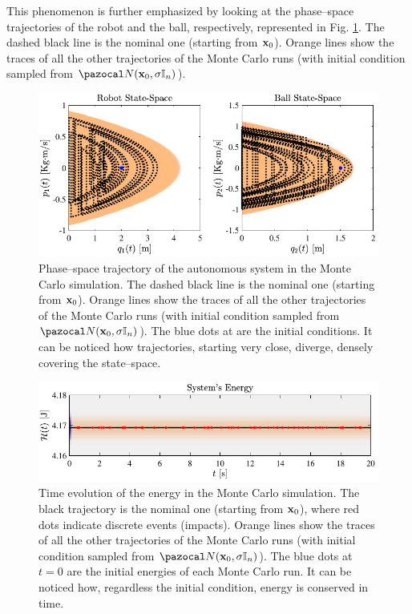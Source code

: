 This phenomenon is further emphasized by looking at the phase--space trajectories of the robot and the ball, respectively, represented in Fig. \ref{fig:chaos2}. The dashed black line is the nominal one (starting from $\mathbf{x}_0$). Orange lines show the traces of all the other trajectories of the Monte Carlo runs (with initial condition sampled from $\N(\xb_0,\sigma\mathbb{I}_n)$). 
%
\begin{figure}[!ht]
    \centering
    \includegraphics[width = \linewidth]{Figures/chaos2.pdf}
    \caption[Phase--space trajectory of the autonomous system in the Monte Carlo simulation]{Phase--space trajectory of the autonomous system in the Monte Carlo simulation. The dashed black line is the nominal one (starting from $\mathbf{x}_0$). Orange lines show the traces of all the other trajectories of the Monte Carlo runs (with initial condition sampled from $\N(\xb_0,\sigma\mathbb{I}_n)$). The blue dots at are the initial conditions. It can be noticed how trajectories, starting very close, diverge, densely covering the state--space.}
    \label{fig:chaos2}
\end{figure}
%
\begin{figure}[!ht]
    \centering
    \includegraphics[width = \linewidth]{Figures/chaos3.pdf}
    \caption[Time evolution of the energy in the Monte Carlo simulation]{Time evolution of the energy in the Monte Carlo simulation. The black trajectory is the nominal one (starting from $\mathbf{x}_0$), where red dots indicate discrete events (impacts). Orange lines show the traces of all the other trajectories of the Monte Carlo runs (with initial condition sampled from $\N(\xb_0,\sigma\mathbb{I}_n)$). The blue dots at $t=0$ are the initial energies of each Monte Carlo run. It can be noticed how, regardless the initial condition, energy is conserved in time.}
    \label{fig:chaos3}
\end{figure}

